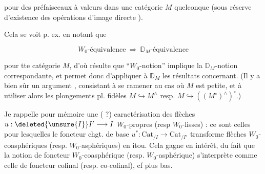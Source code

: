
pour des préfaisceaux à valeurs dans une catégorie $M$ quelconque (sous réserve d'existence des opérations  d'image directe  ).

Cela se voit p. ex. en notant que

\[
W_0\text{-équivalence}\ \Longrightarrow\ \mathbb{D}_M\text{-équivalence}\tag*{(3.10.)}
\]


pour tte catégorie $M$, d'où résulte que  \inserted{(*)} ``$W_0$-notion'' implique la $\mathbb{D}_M$-notion correspondante, et permet donc d'appliquer à $\mathbb{D}_M$ les résultats  concernant. (Il y a bien sûr un argument  , consistant à se ramener au cas où $M$ est petite, et à utiliser alors les plongements pl. fidèles $M\hookrightarrow M^\wedge$ resp. $M\hookrightarrow((M^\circ)^\wedge)^\circ$.)

Je rappelle pour mémoire une ( ?) caractérisation des flèches $u:\deleted{\unsure{I}}I'\longrightarrow I$ $W_0$-propres (resp $W_0$-lisses) : ce sont celles  pour lesquelles le foncteur chgt. de base $u^*:\mathrm{Cat}_{/I}\longrightarrow\mathrm{Cat}_{/I'}$ transforme flèches $W_0$-coasphériques (resp. $W_0$-asphériques) en itou. Cela gagne en intérêt, du fait que la notion de foncteur $W_0$-coasphérique (resp. $W_0$-asphérique) s'interprète comme celle de foncteur cofinal (resp. co-cofinal), cf plus bas.
